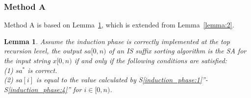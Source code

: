 \documentclass[10pt,journal,compsoc]{IEEEtran}
\newtheorem{lemma}[theorem]{Lemma}
\begin{document}
\subsubsection{Method A} \label{sec:proposals:method_a}

Method A is based on Lemma~\ref{lemma:3}, which is extended from Lemma~\ref{lemma:2}.

\begin{lemma} \label{lemma:3}
	Assume the induction phase is correctly implemented at the top recursion level, the output $sa[0, n)$ of an IS suffix sorting algorithm is the SA for the input string $x[0, n)$ if and only if the following conditions are satisfied: \\
	(1) $sa^*$ is correct. \\
	(2) $sa[i]$ is equal to the value calculated by S\ref{induction_phase:1}''-S\ref{induction_phase:4}'' for $i \in [0, n)$. \\
	
\end{lemma}
\end{document}
